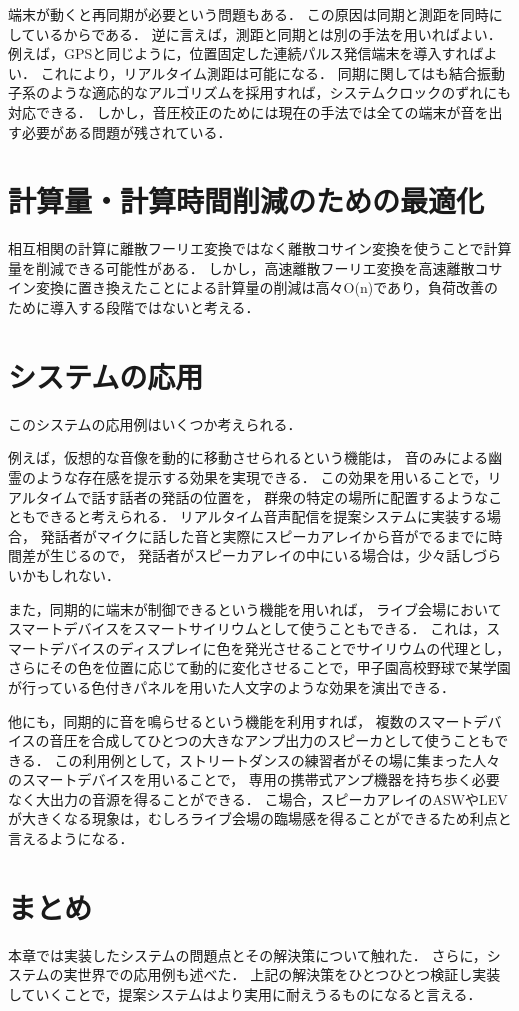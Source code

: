 端末が動くと再同期が必要という問題もある．
この原因は同期と測距を同時にしているからである．
逆に言えば，測距と同期とは別の手法を用いればよい．
例えば，GPSと同じように，位置固定した連続パルス発信端末を導入すればよい．
これにより，リアルタイム測距は可能になる．
同期に関してはも結合振動子系のような適応的なアルゴリズムを採用すれば，システムクロックのずれにも対応できる．
しかし，音圧校正のためには現在の手法では全ての端末が音を出す必要がある問題が残されている．



\section{計算量・計算時間削減のための最適化}
相互相関の計算に離散フーリエ変換ではなく離散コサイン変換を使うことで計算量を削減できる可能性がある．
しかし，高速離散フーリエ変換を高速離散コサイン変換に置き換えたことによる計算量の削減は高々O(n)であり，負荷改善のために導入する段階ではないと考える．


\section{システムの応用}
このシステムの応用例はいくつか考えられる．

例えば，仮想的な音像を動的に移動させられるという機能は，
音のみによる幽霊のような存在感を提示する効果を実現できる．
この効果を用いることで，リアルタイムで話す話者の発話の位置を，
群衆の特定の場所に配置するようなこともできると考えられる．
リアルタイム音声配信を提案システムに実装する場合，
発話者がマイクに話した音と実際にスピーカアレイから音がでるまでに時間差が生じるので，
発話者がスピーカアレイの中にいる場合は，少々話しづらいかもしれない．

また，同期的に端末が制御できるという機能を用いれば，
ライブ会場においてスマートデバイスをスマートサイリウムとして使うこともできる．
これは，スマートデバイスのディスプレイに色を発光させることでサイリウムの代理とし，
さらにその色を位置に応じて動的に変化させることで，甲子園高校野球で某学園が行っている色付きパネルを用いた人文字のような効果を演出できる．

他にも，同期的に音を鳴らせるという機能を利用すれば，
複数のスマートデバイスの音圧を合成してひとつの大きなアンプ出力のスピーカとして使うこともできる．
この利用例として，ストリートダンスの練習者がその場に集まった人々のスマートデバイスを用いることで，
専用の携帯式アンプ機器を持ち歩く必要なく大出力の音源を得ることができる．
こ場合，スピーカアレイのASWやLEVが大きくなる現象は，むしろライブ会場の臨場感を得ることができるため利点と言えるようになる．



\section{まとめ}
本章では実装したシステムの問題点とその解決策について触れた．
さらに，システムの実世界での応用例も述べた．
上記の解決策をひとつひとつ検証し実装していくことで，提案システムはより実用に耐えうるものになると言える．

